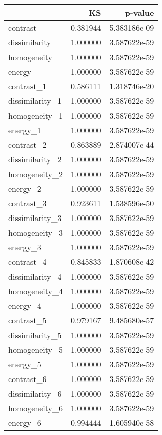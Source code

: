 \begin{tabular}{lrr}
\toprule
{} &        KS &       p-value \\
\midrule
contrast        &  0.381944 &  5.383186e-09 \\
dissimilarity   &  1.000000 &  3.587622e-59 \\
homogeneity     &  1.000000 &  3.587622e-59 \\
energy          &  1.000000 &  3.587622e-59 \\
contrast\_1      &  0.586111 &  1.318746e-20 \\
dissimilarity\_1 &  1.000000 &  3.587622e-59 \\
homogeneity\_1   &  1.000000 &  3.587622e-59 \\
energy\_1        &  1.000000 &  3.587622e-59 \\
contrast\_2      &  0.863889 &  2.874007e-44 \\
dissimilarity\_2 &  1.000000 &  3.587622e-59 \\
homogeneity\_2   &  1.000000 &  3.587622e-59 \\
energy\_2        &  1.000000 &  3.587622e-59 \\
contrast\_3      &  0.923611 &  1.538596e-50 \\
dissimilarity\_3 &  1.000000 &  3.587622e-59 \\
homogeneity\_3   &  1.000000 &  3.587622e-59 \\
energy\_3        &  1.000000 &  3.587622e-59 \\
contrast\_4      &  0.845833 &  1.870608e-42 \\
dissimilarity\_4 &  1.000000 &  3.587622e-59 \\
homogeneity\_4   &  1.000000 &  3.587622e-59 \\
energy\_4        &  1.000000 &  3.587622e-59 \\
contrast\_5      &  0.979167 &  9.485680e-57 \\
dissimilarity\_5 &  1.000000 &  3.587622e-59 \\
homogeneity\_5   &  1.000000 &  3.587622e-59 \\
energy\_5        &  1.000000 &  3.587622e-59 \\
contrast\_6      &  1.000000 &  3.587622e-59 \\
dissimilarity\_6 &  1.000000 &  3.587622e-59 \\
homogeneity\_6   &  1.000000 &  3.587622e-59 \\
energy\_6        &  0.994444 &  1.605940e-58 \\

\end{tabular}
